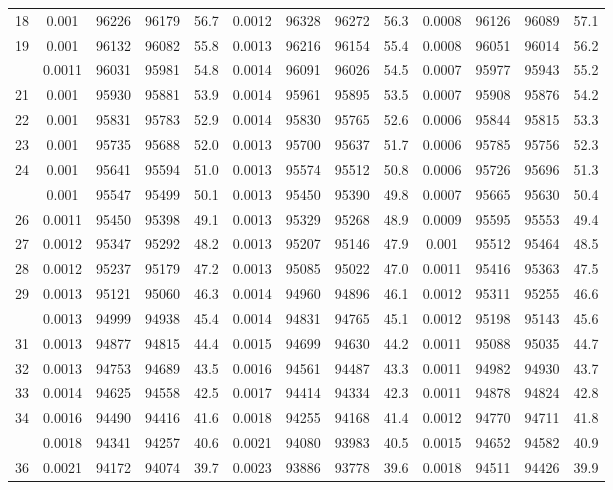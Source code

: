 \documentclass[
  14pt,
]{article}
\begin{document}
\begin{longtable}[t]{lcccccccccccc}
18 & 0.001 & 96226 & 96179 & 56.7 & 0.0012 & 96328 & 96272 & 56.3 & 0.0008 & 96126 & 96089 & 57.1\\
19 & 0.001 & 96132 & 96082 & 55.8 & 0.0013 & 96216 & 96154 & 55.4 & 0.0008 & 96051 & 96014 & 56.2\\
\addlinespace
20 & 0.0011 & 96031 & 95981 & 54.8 & 0.0014 & 96091 & 96026 & 54.5 & 0.0007 & 95977 & 95943 & 55.2\\
21 & 0.001 & 95930 & 95881 & 53.9 & 0.0014 & 95961 & 95895 & 53.5 & 0.0007 & 95908 & 95876 & 54.2\\
22 & 0.001 & 95831 & 95783 & 52.9 & 0.0014 & 95830 & 95765 & 52.6 & 0.0006 & 95844 & 95815 & 53.3\\
23 & 0.001 & 95735 & 95688 & 52.0 & 0.0013 & 95700 & 95637 & 51.7 & 0.0006 & 95785 & 95756 & 52.3\\
24 & 0.001 & 95641 & 95594 & 51.0 & 0.0013 & 95574 & 95512 & 50.8 & 0.0006 & 95726 & 95696 & 51.3\\
\addlinespace
25 & 0.001 & 95547 & 95499 & 50.1 & 0.0013 & 95450 & 95390 & 49.8 & 0.0007 & 95665 & 95630 & 50.4\\
26 & 0.0011 & 95450 & 95398 & 49.1 & 0.0013 & 95329 & 95268 & 48.9 & 0.0009 & 95595 & 95553 & 49.4\\
27 & 0.0012 & 95347 & 95292 & 48.2 & 0.0013 & 95207 & 95146 & 47.9 & 0.001 & 95512 & 95464 & 48.5\\
28 & 0.0012 & 95237 & 95179 & 47.2 & 0.0013 & 95085 & 95022 & 47.0 & 0.0011 & 95416 & 95363 & 47.5\\
29 & 0.0013 & 95121 & 95060 & 46.3 & 0.0014 & 94960 & 94896 & 46.1 & 0.0012 & 95311 & 95255 & 46.6\\
\addlinespace
30 & 0.0013 & 94999 & 94938 & 45.4 & 0.0014 & 94831 & 94765 & 45.1 & 0.0012 & 95198 & 95143 & 45.6\\
31 & 0.0013 & 94877 & 94815 & 44.4 & 0.0015 & 94699 & 94630 & 44.2 & 0.0011 & 95088 & 95035 & 44.7\\
32 & 0.0013 & 94753 & 94689 & 43.5 & 0.0016 & 94561 & 94487 & 43.3 & 0.0011 & 94982 & 94930 & 43.7\\
33 & 0.0014 & 94625 & 94558 & 42.5 & 0.0017 & 94414 & 94334 & 42.3 & 0.0011 & 94878 & 94824 & 42.8\\
34 & 0.0016 & 94490 & 94416 & 41.6 & 0.0018 & 94255 & 94168 & 41.4 & 0.0012 & 94770 & 94711 & 41.8\\
\addlinespace
35 & 0.0018 & 94341 & 94257 & 40.6 & 0.0021 & 94080 & 93983 & 40.5 & 0.0015 & 94652 & 94582 & 40.9\\
36 & 0.0021 & 94172 & 94074 & 39.7 & 0.0023 & 93886 & 93778 & 39.6 & 0.0018 & 94511 & 94426 & 39.9\\

\end{longtable}
\end{document}
